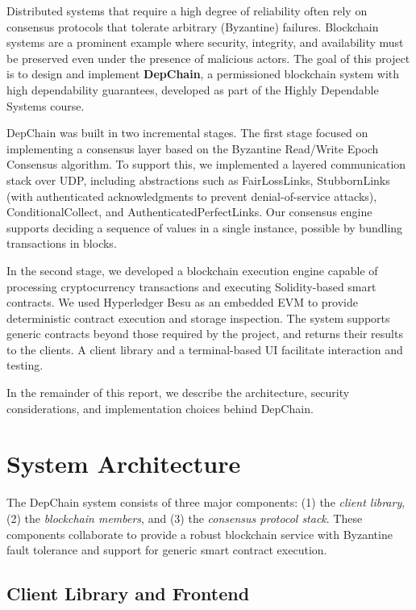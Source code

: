 \documentclass[runningheads]{llncs}
\begin{document}
Distributed systems that require a high degree of reliability often rely on consensus protocols that tolerate arbitrary (Byzantine) failures. Blockchain systems are a prominent example where security, integrity, and availability must be preserved even under the presence of malicious actors. The goal of this project is to design and implement \textbf{DepChain}, a permissioned blockchain system with high dependability guarantees, developed as part of the Highly Dependable Systems course.

DepChain was built in two incremental stages. The first stage focused on implementing a consensus layer based on the Byzantine Read/Write Epoch Consensus algorithm. To support this, we implemented a layered communication stack over UDP, including abstractions such as FairLossLinks, StubbornLinks (with authenticated acknowledgments to prevent denial-of-service attacks), ConditionalCollect, and AuthenticatedPerfectLinks. Our consensus engine supports deciding a sequence of values in a single instance, possible by bundling transactions in blocks.

In the second stage, we developed a blockchain execution engine capable of processing cryptocurrency transactions and executing Solidity-based smart contracts. We used Hyperledger Besu as an embedded EVM to provide deterministic contract execution and storage inspection. The system supports generic contracts beyond those required by the project, and returns their results to the clients. A client library and a terminal-based UI facilitate interaction and testing.

In the remainder of this report, we describe the architecture, security considerations, and implementation choices behind DepChain.

\section{System Architecture}

The DepChain system consists of three major components: (1) the \textit{client library}, (2) the \textit{blockchain members}, and (3) the \textit{consensus protocol stack}. These components collaborate to provide a robust blockchain service with Byzantine fault tolerance and support for generic smart contract execution.

\subsection{Client Library and Frontend}
\end{document}
